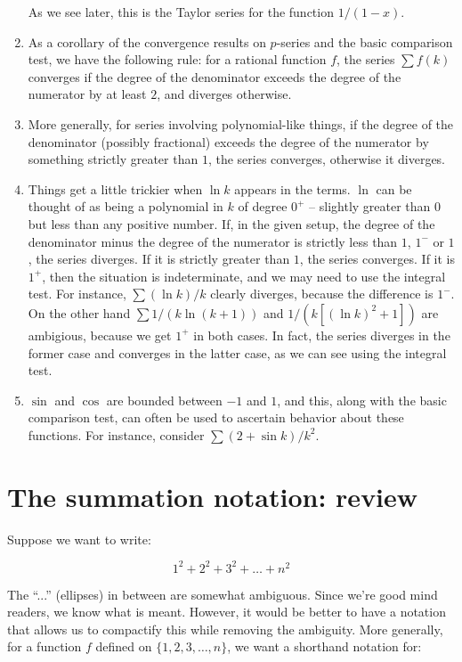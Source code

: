 \documentclass{amsart}
\begin{document}
\begin{enumerate}
  As we see later, this is the Taylor series for the function $1/(1 - x)$.
\item As a corollary of the convergence results on $p$-series and the
  basic comparison test, we have the following rule: for a rational
  function $f$, the series $\sum f(k)$ converges if the degree of the
  denominator exceeds the degree of the numerator by at least $2$, and
  diverges otherwise.
\item More generally, for series involving polynomial-like things, if
  the degree of the denominator (possibly fractional) exceeds the
  degree of the numerator by something strictly greater than $1$, the
  series converges, otherwise it diverges.
\item Things get a little trickier when $\ln k$ appears in the
  terms. $\ln$ can be thought of as being a polynomial in $k$ of
  degree $0^+$ -- slightly greater than $0$ but less than any positive
  number. If, in the given setup, the degree of the denominator minus
  the degree of the numerator is strictly less than $1$, $1^-$ or $1$,
  the series diverges. If it is strictly greater than $1$, the series
  converges. If it is $1^+$, then the situation is indeterminate, and
  we may need to use the integral test. For instance, $\sum (\ln k)/k$
  clearly diverges, because the difference is $1^-$. On the other hand
  $\sum 1/(k \ln (k+1))$ and $1/(k[(\ln k)^2 + 1])$ are ambigious,
  because we get $1^+$ in both cases. In fact, the series diverges in
  the former case and converges in the latter case, as we can see
  using the integral test.
\item $\sin$ and $\cos$ are bounded between $-1$ and $1$, and this,
  along with the basic comparison test, can often be used to ascertain
  behavior about these functions. For instance, consider $\sum (2 +
  \sin k)/k^2$.
\end{enumerate}

\section{The summation notation: review}

Suppose we want to write:

$$1^2 + 2^2 + 3^2 + \dots + n^2$$

The ``...'' (ellipses) in between are somewhat ambiguous. Since we're
good mind readers, we know what is meant. However, it would be better
to have a notation that allows us to compactify this while removing
the ambiguity. More generally, for a function $f$ defined on $\{
1,2,3, \dots, n\}$, we want a shorthand notation for:
\end{document}
